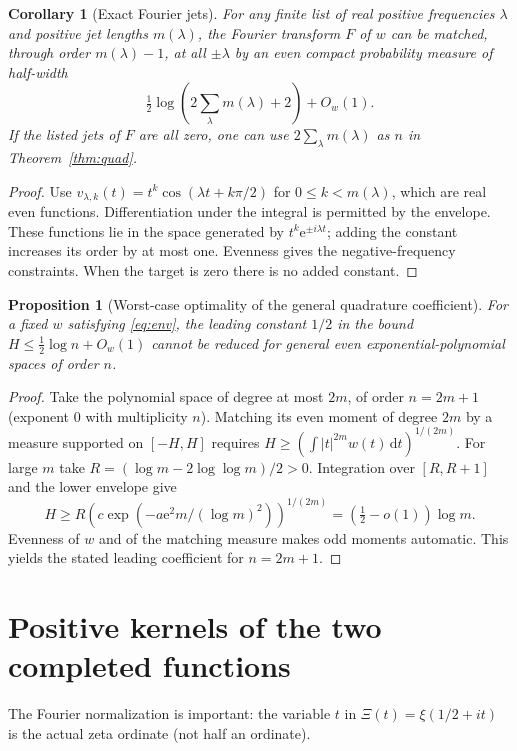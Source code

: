 \documentclass[11pt]{article}
\newtheorem{corollary}[theorem]{Corollary}
\newtheorem{proposition}[theorem]{Proposition}
\theoremstyle{remark}\newtheorem{remark}[theorem]{Remark}
\newcommand{\e}{\mathrm e}
\newcommand{\dd}{\,\mathrm d}
\begin{document}
\begin{corollary}[Exact Fourier jets]\label{cor:jets}
For any finite list of real positive frequencies $\lambda$ and positive jet lengths $m(\lambda)$, the Fourier transform $F$ of $w$ can be matched, through order $m(\lambda)-1$, at all $\pm\lambda$ by an even compact probability measure of half-width
\[
 \tfrac12\log(2\sum_\lambda m(\lambda)+2)+O_w(1).
\]
If the listed jets of $F$ are all zero, one can use $2\sum_\lambda m(\lambda)$ as $n$ in Theorem~\ref{thm:quad}.
\end{corollary}
\begin{proof}
Use $v_{\lambda,k}(t)=t^k\cos(\lambda t+k\pi/2)$ for $0\le k<m(\lambda)$, which are real even functions. Differentiation under the integral is permitted by the envelope. These functions lie in the space generated by $t^k\e^{\pm i\lambda t}$; adding the constant increases its order by at most one. Evenness gives the negative-frequency constraints. When the target is zero there is no added constant.
\end{proof}

\begin{proposition}[Worst-case optimality of the general quadrature coefficient]\label{prop:worst}
For a fixed $w$ satisfying \eqref{eq:env}, the leading constant $1/2$ in the bound $H\le\tfrac12\log n+O_w(1)$ cannot be reduced for general even exponential-polynomial spaces of order $n$.
\end{proposition}
\begin{proof}
Take the polynomial space of degree at most $2m$, of order $n=2m+1$ (exponent $0$ with multiplicity $n$). Matching its even moment of degree $2m$ by a measure supported on $[-H,H]$ requires
$H\ge(\int |t|^{2m} w(t)\dd t)^{1/(2m)}$. For large $m$ take $R=(\log m-2\log\log m)/2>0$. Integration over $[R,R+1]$ and the lower envelope give
\[
 H\ge R\left(c\exp(-a\e^2 m/(\log m)^2)\right)^{1/(2m)}
 =(\tfrac12-o(1))\log m.
\]
Evenness of $w$ and of the matching measure makes odd moments automatic. This yields the stated leading coefficient for $n=2m+1$.
\end{proof}

\section{Positive kernels of the two completed functions}
The Fourier normalization is important: the variable $t$ in $\Xi(t)=\xi(1/2+it)$ is the actual zeta ordinate (not half an ordinate).
\end{document}

